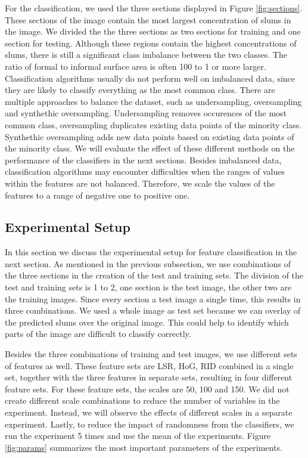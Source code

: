 For the classification, we used the three sections displayed in Figure \ref{fig:sections}. These sections of the image contain the most largest concentration of slums in the image. We divided the the three sections as two sections for training and one section for testing. Although these regions contain the highest concentrations of slums, there is still a significant class imbalance between the two classes. The ratio of formal to informal surface area is often 100 to 1 or more larger. Classification algorithms usually do not perform well on imbalanced data, since they are likely to classify everything as the most common class. There are multiple approaches to balance the dataset, such as undersampling, oversampling and synthethic oversampling. Undersampling removes occurences of the most common class, oversampling duplicates existing data points of the minority class. Synthethic oversampling adds new data points based on existing data points of the minority class. We will evaluate the effect of these different methods on the performance of the classifiers in the next sections.
Besides imbalanced data, classification algorithms may encounter difficulties when the ranges of values within the features are not balanced. Therefore, we scale the values of the features to a range of negative one to positive one.

\subsection{Experimental Setup}

In this section we discuss the experimental setup for feature classification in the next section. As mentioned in the previous subsection, we use combinations of the three sections in the creation of the test and training sets. The division of the test and training sets is 1 to 2, one section is the test image, the other two are the training images. Since every section a test image a single time, this results in three combinations.  We used a whole image as test set because we can overlay of the predicted slums over the original image. This could help to identify which parts of the image are difficult to classify correctly.

Besides the three combinations of training and test images, we use different sets of features as well. These feature sets are LSR, HoG, RID combined in a single set, together with the three features in separate sets, resulting in four different feature sets. For these feature sets, the scales are 50, 100 and 150. We did not create different scale combinations to reduce the number of variables in the experiment. Instead, we will observe the effects of different scales in a separate experiment. Lastly, to reduce the impact of randomness from the classifiers, we run the experiment 5 times and use the mean of the experiments. Figure \ref{fig:params} summarizes the most important parameters of the experiments.

